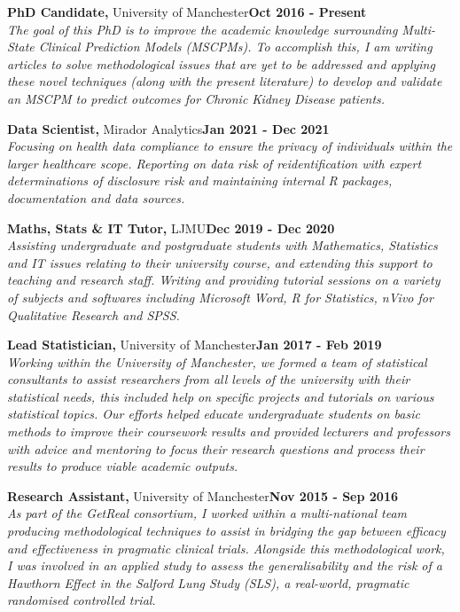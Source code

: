 \documentclass[11pt]{article}
\newcommand{\blue}[1]{\textcolor{MyBlue1}{#1}}
\begin{document}
\newcommand{\experience}[5]{
\blue{\textbf{#1,} #2}\hfill\textbf{#3 - #4}\\
\textit{#5}
}

\experience{PhD Candidate}{University of Manchester}{Oct 2016}{Present}{
The goal of this PhD is to improve the academic knowledge surrounding Multi-State Clinical Prediction Models (MSCPMs). To accomplish this, I am writing articles to solve methodological issues that are yet to be addressed and applying these novel techniques (along with the present literature) to develop and validate an MSCPM to predict outcomes for Chronic Kidney Disease patients.}

\experience{Data Scientist}{Mirador Analytics}{Jan 2021}{Dec 2021}{
Focusing on health data compliance to ensure the privacy of individuals within the larger healthcare scope. Reporting on data risk of reidentification with expert determinations of disclosure risk and maintaining internal R packages, documentation
and data sources.}

\experience{Maths, Stats \& IT Tutor}{LJMU}{Dec 2019}{Dec 2020}{
Assisting undergraduate and postgraduate students with Mathematics, Statistics and IT issues relating to their university course, and extending this support to teaching and research staff. Writing and providing tutorial sessions on a variety of subjects and softwares including Microsoft Word, R for Statistics, nVivo for Qualitative Research and SPSS.}

\experience{Lead Statistician}{University of Manchester}{Jan 2017}{Feb 2019}{
Working within the University of Manchester, we formed a team of statistical consultants to assist researchers from all levels of the university with their statistical needs, this included help on specific projects and tutorials on various statistical topics. Our efforts helped educate undergraduate students on basic methods to improve their coursework results and provided lecturers and professors with advice and mentoring to focus their research questions and process their results to produce viable academic outputs.}

\experience{Research Assistant}{University of Manchester}{Nov 2015}{Sep 2016}{
As part of the GetReal consortium, I worked within a multi-national team producing methodological techniques to assist in bridging the gap between efficacy and effectiveness in pragmatic clinical trials. Alongside this methodological work, I was involved in an applied study to assess the generalisability and the risk of a Hawthorn Effect in the Salford Lung Study (SLS), a real-world, pragmatic randomised controlled trial.}
\end{document}
